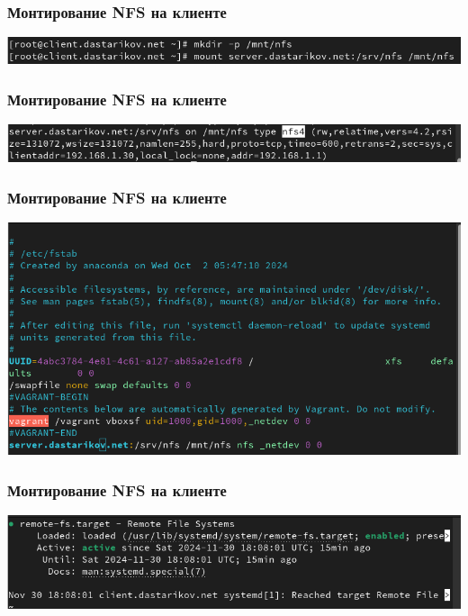 
\begin{frame}
\frametitle{Монтирование NFS на клиенте}
    \includegraphics[width=\textwidth]{../images/image07.png}
\end{frame}

\begin{frame}
\frametitle{Монтирование NFS на клиенте}
    \includegraphics[width=\textwidth]{../images/image08.png}
\end{frame}

\begin{frame}
\frametitle{Монтирование NFS на клиенте}
    \includegraphics[width=\textwidth]{../images/image09.png}
\end{frame}

\begin{frame}
\frametitle{Монтирование NFS на клиенте}
    \includegraphics[width=\textwidth]{../images/image10.png}
\end{frame}

